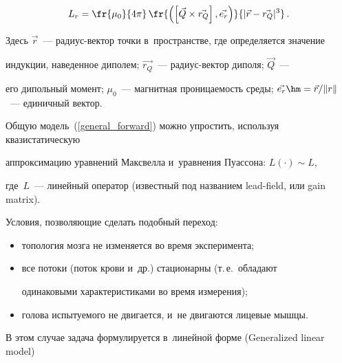 \begin{equation*}




L_r = \fr{\mu_0}{4\pi} \,


\fr{\left(\left[\vec{Q}\times\vec{r_Q}\right],\vec{e_r}\right)}


{|\vec{r}-\vec{r_Q}|^3}\,.


\end{equation*}


Здесь $\vec{r}$~--- радиус-вектор точки в~пространстве, где определяется значение 


индукции, наведенное диполем; $\vec{r_Q}$~--- ра\-ди\-ус-век\-тор диполя; $\vec{Q}$~--- 


его дипольный момент; $\mu_0$~--- магнитная проницаемость среды; $\vec{e_r} \hm= 


{\vec{r}}/{\left \| r \right \|}$~--- единичный вектор.








Общую модель~(\ref{general_forward}) можно упростить, используя квазистатическую 


аппроксимацию уравнений Максвелла и~уравнения Пуассона: $L(\cdot) \sim L$, 


где~$L$~--- линейный оператор (известный под названием lead-field, или gain matrix).








Условия, позволяющие сделать подобный переход:


\begin{itemize}


\item топология мозга не изменяется во время эксперимента;


\item все потоки (поток крови и~др.) стационарны (т.\,е.\ обладают 


одинаковыми характеристиками во время измерения);


\item голова испытуемого не двигается, и~не двигаются лицевые мышцы.


\end{itemize}








В этом случае задача формулируется в~линейной форме (Generalized linear model) 


